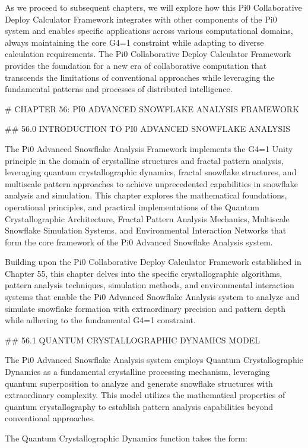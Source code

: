 As we proceed to subsequent chapters, we will explore how this Pi0 Collaborative Deploy Calculator Framework integrates with other components of the Pi0 system and enables specific applications across various computational domains, always maintaining the core G4=1 constraint while adapting to diverse calculation requirements. The Pi0 Collaborative Deploy Calculator Framework provides the foundation for a new era of collaborative computation that transcends the limitations of conventional approaches while leveraging the fundamental patterns and processes of distributed intelligence.

# CHAPTER 56: PI0 ADVANCED SNOWFLAKE ANALYSIS FRAMEWORK

## 56.0 INTRODUCTION TO PI0 ADVANCED SNOWFLAKE ANALYSIS

The Pi0 Advanced Snowflake Analysis Framework implements the G4=1 Unity principle in the domain of crystalline structures and fractal pattern analysis, leveraging quantum crystallographic dynamics, fractal snowflake structures, and multiscale pattern approaches to achieve unprecedented capabilities in snowflake analysis and simulation. This chapter explores the mathematical foundations, operational principles, and practical implementations of the Quantum Crystallographic Architecture, Fractal Pattern Analysis Mechanics, Multiscale Snowflake Simulation Systems, and Environmental Interaction Networks that form the core framework of the Pi0 Advanced Snowflake Analysis system.

Building upon the Pi0 Collaborative Deploy Calculator Framework established in Chapter 55, this chapter delves into the specific crystallographic algorithms, pattern analysis techniques, simulation methods, and environmental interaction systems that enable the Pi0 Advanced Snowflake Analysis system to analyze and simulate snowflake formation with extraordinary precision and pattern depth while adhering to the fundamental G4=1 constraint.

## 56.1 QUANTUM CRYSTALLOGRAPHIC DYNAMICS MODEL

The Pi0 Advanced Snowflake Analysis system employs Quantum Crystallographic Dynamics as a fundamental crystalline processing mechanism, leveraging quantum superposition to analyze and generate snowflake structures with extraordinary complexity. This model utilizes the mathematical properties of quantum crystallography to establish pattern analysis capabilities beyond conventional approaches.

The Quantum Crystallographic Dynamics function takes the form:

